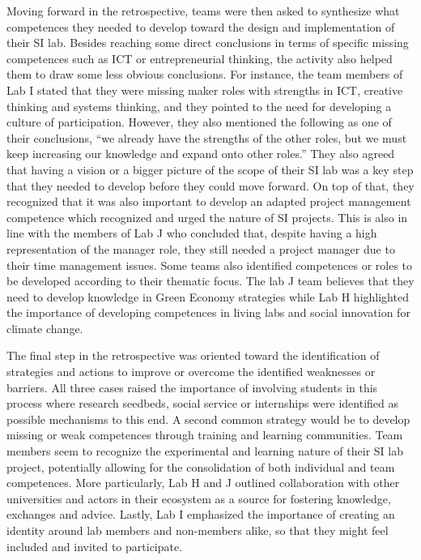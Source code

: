 \documentclass[AMA,STIX1COL,APA,STIX2COL]{WileyNJD-v2}
\begin{document}
Moving forward in the retrospective, teams were then asked to synthesize
what competences they needed to develop toward the design and
implementation of their SI lab. Besides reaching some direct conclusions
in terms of specific missing competences such as ICT or entrepreneurial
thinking, the activity also helped them to draw some less obvious
conclusions. For instance, the team members of Lab I stated that they
were missing maker roles with strengths in ICT, creative thinking and
systems thinking, and they pointed to the need for developing a culture
of participation. However, they also mentioned the following as one of
their conclusions, ``we already have the strengths of the other roles,
but we must keep increasing our knowledge and expand onto other roles.''
They also agreed that having a vision or a bigger picture of the scope
of their SI lab was a key step that they needed to develop before they
could move forward. On top of that, they recognized that it was also
important to develop an adapted project management competence which
recognized and urged the nature of SI projects. This is also in line
with the members of Lab J who concluded that, despite having a high
representation of the manager role, they still needed a project manager
due to their time management issues. Some teams also identified
competences or roles to be developed according to their thematic focus.
The lab J team believes that they need to develop knowledge in Green
Economy strategies while Lab H highlighted the importance of developing
competences in living labs and social innovation for climate change.

The final step in the retrospective was oriented toward the
identification of strategies and actions to improve or overcome the
identified weaknesses or barriers. All three cases raised the importance
of involving students in this process where research seedbeds, social
service or internships were identified as possible mechanisms to this
end. A second common strategy would be to develop missing or weak
competences through training and learning communities. Team members seem
to recognize the experimental and learning nature of their SI lab
project, potentially allowing for the consolidation of both individual
and team competences. More particularly, Lab H and J outlined
collaboration with other universities and actors in their ecosystem as a
source for fostering knowledge, exchanges and advice. Lastly, Lab I
emphasized the importance of creating an identity around lab members and
non-members alike, so that they might feel included and invited to
participate.
\end{document}
